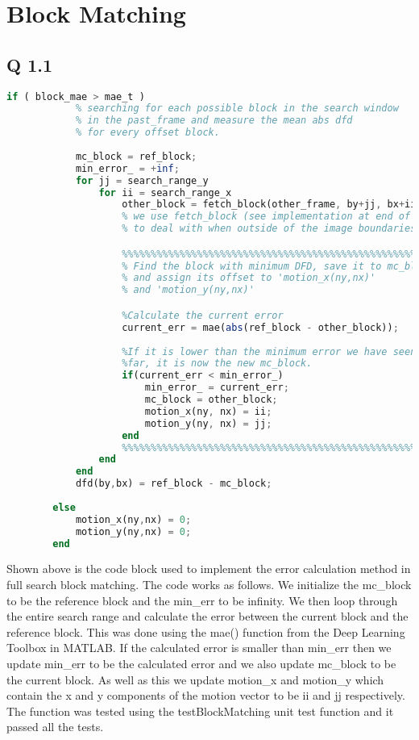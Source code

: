 
\section{Block Matching}
\subsection{Q 1.1}
\begin{lstlisting}[language=Octave]
        if ( block_mae > mae_t )            
            % searching for each possible block in the search window
            % in the past_frame and measure the mean abs dfd
            % for every offset block.
            
            mc_block = ref_block;
            min_error_ = +inf;
            for jj = search_range_y
                for ii = search_range_x
                    other_block = fetch_block(other_frame, by+jj, bx+ii);
                    % we use fetch_block (see implementation at end of file) 
                    % to deal with when outside of the image boundaries.

                    %%%%%%%%%%%%%%%%%%%%%%%%%%%%%%%%%%%%%%%%%%%%%%%%%%%%%%
                    % Find the block with minimum DFD, save it to mc_block
                    % and assign its offset to 'motion_x(ny,nx)' 
                    % and 'motion_y(ny,nx)'

                    %Calculate the current error
                    current_err = mae(abs(ref_block - other_block));
                    
                    %If it is lower than the minimum error we have seen so
                    %far, it is now the new mc_block.
                    if(current_err < min_error_)
                        min_error_ = current_err;
                        mc_block = other_block;
                        motion_x(ny, nx) = ii;
                        motion_y(ny, nx) = jj;
                    end
                    %%%%%%%%%%%%%%%%%%%%%%%%%%%%%%%%%%%%%%%%%%%%%%%%%%%%%%%
                end
            end
            dfd(by,bx) = ref_block - mc_block;
            
        else
            motion_x(ny,nx) = 0;
            motion_y(ny,nx) = 0;
        end    
\end{lstlisting}

Shown above is the code block used to implement the error calculation method in full search block matching. The code
works as follows. We initialize the mc\_block to be the reference block and the min\_err to be infinity. We then loop
through the entire search range and calculate the error between the current block and the reference block. This was done
using the mae() function from the Deep Learning Toolbox in MATLAB. If the calculated error is smaller than min\_err then
we update min\_err to be the calculated error and we also update mc\_block to be the current block. As well as this we
update motion\_x and motion\_y which contain the x and y components of the motion vector to be ii and jj respectively. The
function was tested using the testBlockMatching unit test function and it passed all the tests.


